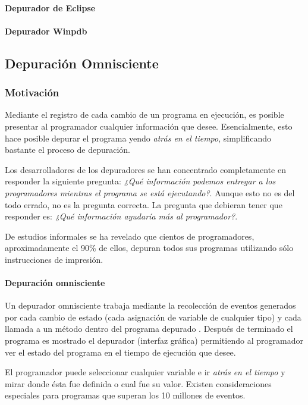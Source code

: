 \documentclass[12pt,legalpaper]{report}
\begin{document}
				\paragraph{Depurador de Eclipse}
				\paragraph{Depurador Winpdb }	

		\subsection{Depuración Omnisciente}
			\subsubsection{Motivación}

Mediante el registro de cada cambio de un programa en ejecución, es posible presentar al programador cualquier información que desee.  Esencialmente, esto hace posible depurar el programa yendo \textit{atrás en el tiempo}, simplificando bastante el proceso de depuración.


Los desarrolladores de los depuradores se han concentrado completamente en responder la siguiente pregunta: \textit{¿Qué información podemos entregar a los programadores mientras el programa se está ejecutando?}.  Aunque esto no es del todo errado, no es la pregunta correcta.  La pregunta que debieran tener que responder es: \textit{¿Qué información ayudaría más al programador?}.

De estudios informales \cite{} se ha revelado que cientos de programadores, aproximadamente el 90\% de ellos, depuran todos sus programas utilizando sólo instrucciones de impresión.


			\paragraph{Depuración omnisciente}

Un depurador omnisciente trabaja mediante la recolección de eventos generados por cada cambio de estado (cada asignación de variable de cualquier tipo) y cada llamada a un método dentro del programa depurado \cite{odb} \cite{tod}.  Después de terminado el programa es mostrado el depurador (interfaz gráfica) permitiendo al programador ver el estado del programa en el tiempo de ejecución que desee.  

El programador puede seleccionar cualquier variable e ir \textit{atrás en el tiempo} y mirar donde ésta fue definida o cual fue su valor. Existen consideraciones especiales para programas que superan los 10 millones de eventos.
\end{document}

